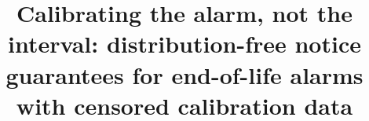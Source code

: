 \documentclass[a4paper,fleqn,doubleblind]{cas-dc}
\theoremstyle{plain}
\theoremstyle{remark}
\begin{document}
\let\WriteBookmarks\relax
\let\printorcid\relax
\def\floatpagepagefraction{1}
\def\textpagefraction{.001}
\title[mode=title]{Calibrating the alarm, not the interval: distribution-free notice guarantees for end-of-life alarms with censored calibration data}

\maketitle
\linenumbers







\end{document}
